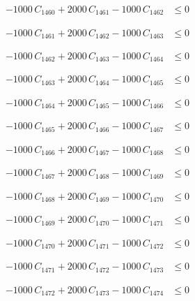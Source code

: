 \documentclass[a4paper,11pt]{article}
\begin{document}
\begin{align}
-1000\,C_{1460} + 2000\,C_{1461} - 1000\,C_{1462} &\leq 0 \nonumber
\end{align}

\begin{align}
-1000\,C_{1461} + 2000\,C_{1462} - 1000\,C_{1463} &\leq 0 \nonumber
\end{align}

\begin{align}
-1000\,C_{1462} + 2000\,C_{1463} - 1000\,C_{1464} &\leq 0 \nonumber
\end{align}

\begin{align}
-1000\,C_{1463} + 2000\,C_{1464} - 1000\,C_{1465} &\leq 0 \nonumber
\end{align}

\begin{align}
-1000\,C_{1464} + 2000\,C_{1465} - 1000\,C_{1466} &\leq 0 \nonumber
\end{align}

\begin{align}
-1000\,C_{1465} + 2000\,C_{1466} - 1000\,C_{1467} &\leq 0 \nonumber
\end{align}

\begin{align}
-1000\,C_{1466} + 2000\,C_{1467} - 1000\,C_{1468} &\leq 0 \nonumber
\end{align}

\begin{align}
-1000\,C_{1467} + 2000\,C_{1468} - 1000\,C_{1469} &\leq 0 \nonumber
\end{align}

\begin{align}
-1000\,C_{1468} + 2000\,C_{1469} - 1000\,C_{1470} &\leq 0 \nonumber
\end{align}

\begin{align}
-1000\,C_{1469} + 2000\,C_{1470} - 1000\,C_{1471} &\leq 0 \nonumber
\end{align}

\begin{align}
-1000\,C_{1470} + 2000\,C_{1471} - 1000\,C_{1472} &\leq 0 \nonumber
\end{align}

\begin{align}
-1000\,C_{1471} + 2000\,C_{1472} - 1000\,C_{1473} &\leq 0 \nonumber
\end{align}

\begin{align}
-1000\,C_{1472} + 2000\,C_{1473} - 1000\,C_{1474} &\leq 0 \nonumber
\end{align}
\end{document}
